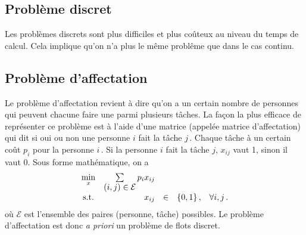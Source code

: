 \subsection{Problème discret}

	Les problèmes discrets sont plus difficiles et plus coûteux
	au niveau du temps de calcul.
	Cela implique qu'on n'a plus le même problême que dans le cas continu.

\subsection{Problème d'affectation}
\label{sec:affectation}

	\begin{center}
	\end{center}

	Le problème d'affectation revient à dire
	qu'on a un certain nombre de personnes
	qui peuvent chacune faire une parmi plusieurs tâches.
	La façon la plus efficace de représenter ce problème
	est à l'aide d'une matrice (appelée matrice d'affectation)
	qui dit si oui ou non une personne $i$
	fait la tâche $j\,$.
	Chaque tâche à un certain coût $p_i$ pour la personne $i\,$.
	Si la personne $i$ fait la tâche $j$, $x_{ij}$ vaut 1,
	sinon il vaut 0.
	Sous forme mathématique, on a
	\begin{equation*}
	\begin{array}{c@{\quad} r c l@{\quad} l}
		\min\limits_{x} & \sum\limits_{{\displaystyle (i,j) \in \mathcal{E}}} p_i x_{ij} &&&\\
		\textnormal{s.t.} & x_{ij} & \in & \{0, 1\}\,, & \forall i,j\,.
	\end{array}
	\end{equation*}
	où $\mathcal{E}$ est l'ensemble
	des paires (personne, tâche) possibles.
	Le problème d'affectation est donc \textit{a priori}
	un problème de flots discret.
